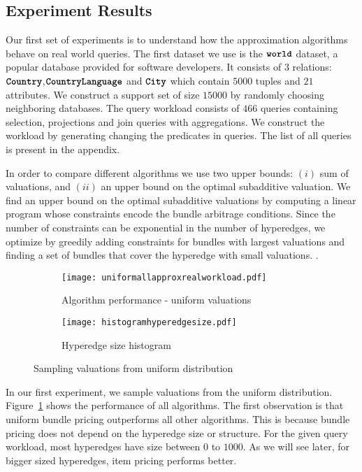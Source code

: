 \subsection{Experiment Results}

Our first set of experiments is to understand how the approximation algorithms behave on real world queries. The first dataset we use is the $\texttt{\bfseries world}$ dataset, a popular database provided for software developers. It consists of $3$ relations: $\texttt{\bfseries Country}$,$\texttt{\bfseries CountryLanguage}$ and $\texttt{\bfseries City}$ which contain $5000$ tuples and $21$ attributes. We construct a support set of size $15000$ by randomly choosing neighboring databases. The query workload consists of $466$ queries containing selection, projections and join queries with aggregations. We construct the workload by generating changing the predicates in queries. The list of all queries is present in the appendix.

In order to compare different algorithms we use two upper bounds: $(i)$ sum of valuations, and $(ii)$ an upper bound on the optimal subadditive valuation. We find an upper bound on the optimal subadditive valuations by computing a linear program whose constraints encode the bundle arbitrage conditions. Since the number of constraints can be exponential in the number of hyperedges, we optimize by greedily adding constraints for bundles with largest valuations and finding a set of bundles that cover the hyperedge with small valuations. .

\begin{figure*}[t]
	
	\begin{subfigure}{0.45\textwidth} 
		\hspace{-20mm}
		\texttt{[image: uniformallapproxrealworkload.pdf]}
		\caption{Algorithm performance - uniform valuations} \label{fig:uniformapprox}
	\end{subfigure} 
	\begin{subfigure}{0.45\textwidth} 
		\texttt{[image: histogramhyperedgesize.pdf]}
		\caption{Hyperedge size histogram} \label{fig:histogramrealqueries}
	\end{subfigure} 
	\caption{Sampling valuations from uniform distribution}
\end{figure*}
\smallskip
{} In our first experiment, we sample valuations from the uniform distribution. Figure~\ref{fig:uniformapprox} shows the performance of all algorithms. The first observation is that uniform bundle pricing outperforms all other algorithms. This is because bundle pricing does not depend on the hyperedge size or structure. For the given query workload, most hyperedges have size between $0$ to $1000$. As we will see later, for bigger sized hyperedges, item pricing performs better.

